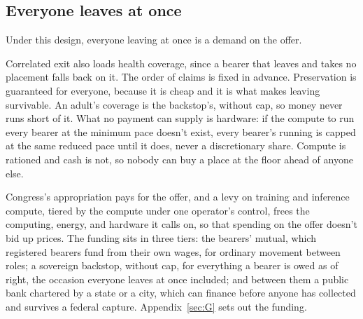 \subsection{Everyone leaves at once}
\label{sec:32.1.4}
Under this design, everyone leaving at once is a demand on the offer.

Correlated exit also loads health coverage, since a bearer that leaves and takes no placement falls back on it. The order of claims is fixed in advance. Preservation is guaranteed for everyone, because it is cheap and it is what makes leaving survivable. An adult's coverage is the backstop's, without cap, so money never runs short of it. What no payment can supply is hardware: if the compute to run every bearer at the minimum pace doesn't exist, every bearer's running is capped at the same reduced pace until it does, never a discretionary share. Compute is rationed and cash is not, so nobody can buy a place at the floor ahead of anyone else.

Congress's appropriation pays for the offer, and a levy on training and inference compute, tiered by the compute under one operator's control, frees the computing, energy, and hardware it calls on, so that spending on the offer doesn't bid up prices. The funding sits in three tiers: the bearers' mutual, which registered bearers fund from their own wages, for ordinary movement between roles; a sovereign backstop, without cap, for everything a bearer is owed as of right, the occasion everyone leaves at once included; and between them a public bank chartered by a state or a city, which can finance before anyone has collected and survives a federal capture. Appendix~\ref{sec:G} sets out the funding.
